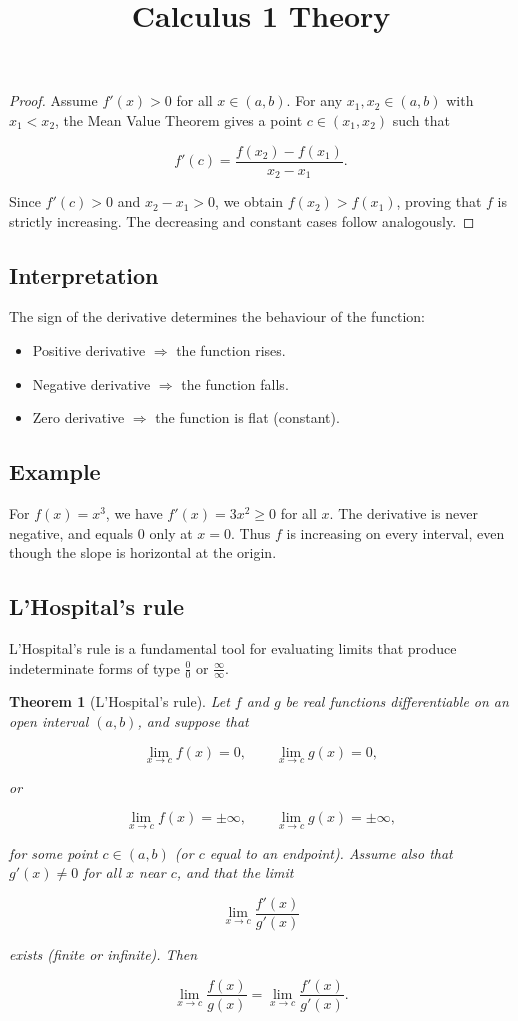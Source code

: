 \documentclass[11pt,a4paper]{article} \usepackage[T1]{fontenc}
\theoremstyle{plain} \newtheorem{theorem}{Theorem} \title{Calculus 1 Theory}
\begin{document}
\begin{proof}
Assume $f'(x) > 0$ for all $x \in (a,b)$. For any $x_1, x_2 \in (a,b)$ with
$x_1 < x_2$, the Mean Value Theorem gives a point $c \in (x_1, x_2)$ such that

\[
f'(c) = \frac{f(x_2) - f(x_1)}{x_2 - x_1}.
\]

Since $f'(c) > 0$ and $x_2 - x_1 > 0$, we obtain $f(x_2) > f(x_1)$, proving
that $f$ is strictly increasing. The decreasing and constant cases follow
analogously.
\end{proof}

\subsection*{Interpretation}

The sign of the derivative determines the behaviour of the function:

\begin{itemize}
\item Positive derivative $\Rightarrow$ the function rises.
\item Negative derivative $\Rightarrow$ the function falls.
\item Zero derivative $\Rightarrow$ the function is flat (constant).
\end{itemize}

\subsection*{Example}

For $f(x)=x^3$, we have $f'(x)=3x^2 \ge 0$ for all $x$. The derivative is never
negative, and equals $0$ only at $x=0$. Thus $f$ is increasing on every
interval, even though the slope is horizontal at the origin.

\subsection {L'Hospital's rule}

L'Hospital's rule is a fundamental tool for evaluating limits that produce
indeterminate forms of type $\frac{0}{0}$ or $\frac{\infty}{\infty}$.

\begin{theorem}
[L'Hospital's rule] Let $f$ and $g$ be real functions differentiable on an open
interval $(a,b)$, and suppose that

\[
\lim_{x\to c} f(x) = 0, \qquad \lim_{x\to c} g(x) = 0,
\]

or

\[
\lim_{x\to c} f(x) = \pm\infty, \qquad \lim_{x\to c} g(x) = \pm\infty,
\]

for some point $c\in(a,b)$ (or $c$ equal to an endpoint). Assume also that
$g'(x)\neq 0$ for all $x$ near $c$, and that the limit

\[
\lim_{x\to c} \frac{f'(x)}{g'(x)}
\]

exists (finite or infinite). Then

\[
\lim_{x\to c} \frac{f(x)}{g(x)} = \lim_{x\to c} \frac{f'(x)}{g'(x)}.
\]

\end{theorem}
\end{document}
